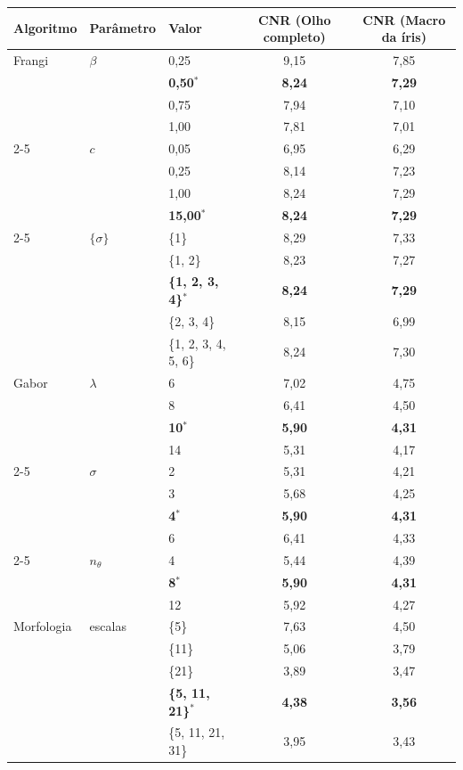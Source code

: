 \begin{tabular}{lllcc}
\toprule
Algoritmo & Parâmetro & Valor & CNR (Olho completo) & CNR (Macro da íris) \\
\midrule
Frangi & $\beta$ & 0,25 & 9,15 & 7,85 \\
 &  & \textbf{0,50}$^\ast$ & \textbf{8,24} & \textbf{7,29} \\
 &  & 0,75 & 7,94 & 7,10 \\
 &  & 1,00 & 7,81 & 7,01 \\
\cmidrule(lr){2-5}
 & $c$ & 0,05 & 6,95 & 6,29 \\
 &  & 0,25 & 8,14 & 7,23 \\
 &  & 1,00 & 8,24 & 7,29 \\
 &  & \textbf{15,00}$^\ast$ & \textbf{8,24} & \textbf{7,29} \\
\cmidrule(lr){2-5}
 & $\{\sigma\}$ & \{1\} & 8,29 & 7,33 \\
 &  & \{1, 2\} & 8,23 & 7,27 \\
 &  & \textbf{\{1, 2, 3, 4\}}$^\ast$ & \textbf{8,24} & \textbf{7,29} \\
 &  & \{2, 3, 4\} & 8,15 & 6,99 \\
 &  & \{1, 2, 3, 4, 5, 6\} & 8,24 & 7,30 \\
\midrule
Gabor & $\lambda$ & 6 & 7,02 & 4,75 \\
 &  & 8 & 6,41 & 4,50 \\
 &  & \textbf{10}$^\ast$ & \textbf{5,90} & \textbf{4,31} \\
 &  & 14 & 5,31 & 4,17 \\
\cmidrule(lr){2-5}
 & $\sigma$ & 2 & 5,31 & 4,21 \\
 &  & 3 & 5,68 & 4,25 \\
 &  & \textbf{4}$^\ast$ & \textbf{5,90} & \textbf{4,31} \\
 &  & 6 & 6,41 & 4,33 \\
\cmidrule(lr){2-5}
 & $n_\theta$ & 4 & 5,44 & 4,39 \\
 &  & \textbf{8}$^\ast$ & \textbf{5,90} & \textbf{4,31} \\
 &  & 12 & 5,92 & 4,27 \\
\midrule
Morfologia & escalas & \{5\} & 7,63 & 4,50 \\
 &  & \{11\} & 5,06 & 3,79 \\
 &  & \{21\} & 3,89 & 3,47 \\
 &  & \textbf{\{5, 11, 21\}}$^\ast$ & \textbf{4,38} & \textbf{3,56} \\
 &  & \{5, 11, 21, 31\} & 3,95 & 3,43 \\
\bottomrule
\end{tabular}
